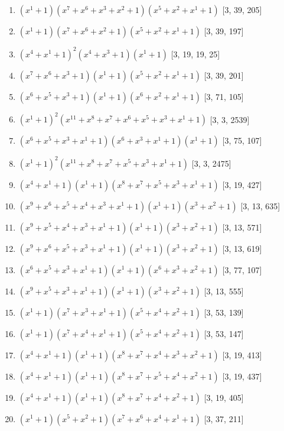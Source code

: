 \documentclass[10pt,twocolumn]{article}
\begin{document}
\begin{enumerate}
\item $(x^{1} + 1)(x^{7} + x^{6} + x^{3} + x^{2} + 1)(x^{5} + x^{2} + x^{1} + 1)$  [3, 39, 205]
\item $(x^{1} + 1)(x^{7} + x^{6} + x^{2} + 1)(x^{5} + x^{2} + x^{1} + 1)$  [3, 39, 197]
\item $(x^{4} + x^{1} + 1)^{2}(x^{4} + x^{3} + 1)(x^{1} + 1)$  [3, 19, 19, 25]
\item $(x^{7} + x^{6} + x^{3} + 1)(x^{1} + 1)(x^{5} + x^{2} + x^{1} + 1)$  [3, 39, 201]
\item $(x^{6} + x^{5} + x^{3} + 1)(x^{1} + 1)(x^{6} + x^{2} + x^{1} + 1)$  [3, 71, 105]
\item $(x^{1} + 1)^{2}(x^{11} + x^{8} + x^{7} + x^{6} + x^{5} + x^{3} + x^{1} + 1)$  [3, 3, 2539]
\item $(x^{6} + x^{5} + x^{3} + x^{1} + 1)(x^{6} + x^{3} + x^{1} + 1)(x^{1} + 1)$  [3, 75, 107]
\item $(x^{1} + 1)^{2}(x^{11} + x^{8} + x^{7} + x^{5} + x^{3} + x^{1} + 1)$  [3, 3, 2475]
\item $(x^{4} + x^{1} + 1)(x^{1} + 1)(x^{8} + x^{7} + x^{5} + x^{3} + x^{1} + 1)$  [3, 19, 427]
\item $(x^{9} + x^{6} + x^{5} + x^{4} + x^{3} + x^{1} + 1)(x^{1} + 1)(x^{3} + x^{2} + 1)$  [3, 13, 635]
\item $(x^{9} + x^{5} + x^{4} + x^{3} + x^{1} + 1)(x^{1} + 1)(x^{3} + x^{2} + 1)$  [3, 13, 571]
\item $(x^{9} + x^{6} + x^{5} + x^{3} + x^{1} + 1)(x^{1} + 1)(x^{3} + x^{2} + 1)$  [3, 13, 619]
\item $(x^{6} + x^{5} + x^{3} + x^{1} + 1)(x^{1} + 1)(x^{6} + x^{3} + x^{2} + 1)$  [3, 77, 107]
\item $(x^{9} + x^{5} + x^{3} + x^{1} + 1)(x^{1} + 1)(x^{3} + x^{2} + 1)$  [3, 13, 555]
\item $(x^{1} + 1)(x^{7} + x^{3} + x^{1} + 1)(x^{5} + x^{4} + x^{2} + 1)$  [3, 53, 139]
\item $(x^{1} + 1)(x^{7} + x^{4} + x^{1} + 1)(x^{5} + x^{4} + x^{2} + 1)$  [3, 53, 147]
\item $(x^{4} + x^{1} + 1)(x^{1} + 1)(x^{8} + x^{7} + x^{4} + x^{3} + x^{2} + 1)$  [3, 19, 413]
\item $(x^{4} + x^{1} + 1)(x^{1} + 1)(x^{8} + x^{7} + x^{5} + x^{4} + x^{2} + 1)$  [3, 19, 437]
\item $(x^{4} + x^{1} + 1)(x^{1} + 1)(x^{8} + x^{7} + x^{4} + x^{2} + 1)$  [3, 19, 405]
\item $(x^{1} + 1)(x^{5} + x^{2} + 1)(x^{7} + x^{6} + x^{4} + x^{1} + 1)$  [3, 37, 211]

\end{enumerate}
\end{document}

